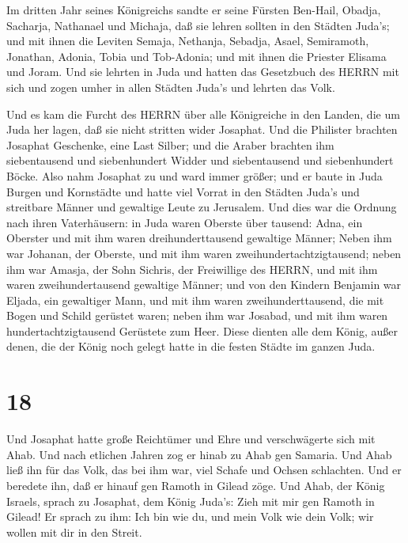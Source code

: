  Im dritten Jahr seines Königreichs sandte er seine Fürsten
Ben-Hail, Obadja, Sacharja, Nathanael und Michaja, daß sie lehren
sollten in den Städten Juda's;  und mit ihnen die Leviten
Semaja, Nethanja, Sebadja, Asael, Semiramoth, Jonathan, Adonia, Tobia
und Tob-Adonia; und mit ihnen die Priester Elisama und Joram.
 Und sie lehrten in Juda und hatten das Gesetzbuch des HERRN
mit sich und zogen umher in allen Städten Juda's und lehrten das Volk.

 Und es kam die Furcht des HERRN über alle Königreiche in
den Landen, die um Juda her lagen, daß sie nicht stritten wider
Josaphat.  Und die Philister brachten Josaphat Geschenke,
eine Last Silber; und die Araber brachten ihm siebentausend und
siebenhundert Widder und siebentausend und siebenhundert Böcke.
 Also nahm Josaphat zu und ward immer größer; und er baute
in Juda Burgen und Kornstädte  und hatte viel Vorrat in den
Städten Juda's und streitbare Männer und gewaltige Leute zu Jerusalem.
 Und dies war die Ordnung nach ihren Vaterhäusern: in Juda
waren Oberste über tausend: Adna, ein Oberster und mit ihm waren
dreihunderttausend gewaltige Männer;  Neben ihm war
Johanan, der Oberste, und mit ihm waren zweihundertachtzigtausend;
 neben ihm war Amasja, der Sohn Sichris, der Freiwillige
des HERRN, und mit ihm waren zweihundertausend gewaltige Männer;
 und von den Kindern Benjamin war Eljada, ein gewaltiger
Mann, und mit ihm waren zweihunderttausend, die mit Bogen und Schild
gerüstet waren;  neben ihm war Josabad, und mit ihm waren
hundertachtzigtausend Gerüstete zum Heer.  Diese dienten
alle dem König, außer denen, die der König noch gelegt hatte in die
festen Städte im ganzen Juda.

\hypertarget{section-17}{%
\section{18}\label{section-17}}

 Und Josaphat hatte große Reichtümer und Ehre und
verschwägerte sich mit Ahab.  Und nach etlichen Jahren zog
er hinab zu Ahab gen Samaria. Und Ahab ließ ihn für das Volk, das bei
ihm war, viel Schafe und Ochsen schlachten. Und er beredete ihn, daß er
hinauf gen Ramoth in Gilead zöge.  Und Ahab, der König
Israels, sprach zu Josaphat, dem König Juda's: Zieh mit mir gen Ramoth
in Gilead! Er sprach zu ihm: Ich bin wie du, und mein Volk wie dein
Volk; wir wollen mit dir in den Streit.

